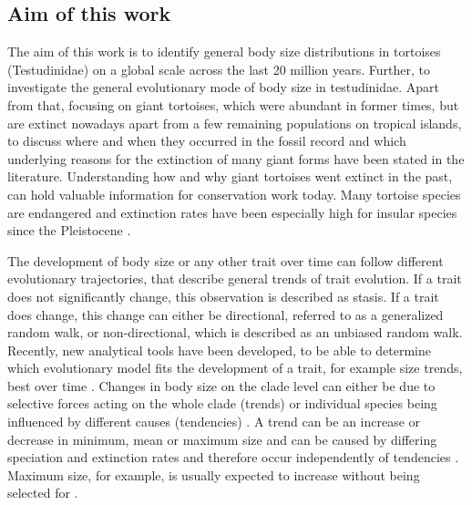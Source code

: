 
 

\subsection{Aim of this work}

The aim of this work is to identify general body size distributions in tortoises (Testudinidae) on a global scale across the last 20 million years. Further, to investigate the general evolutionary mode of body size in testudinidae. 
Apart from that, focusing on giant tortoises, which were abundant in former times, but are extinct nowadays apart from a few remaining populations on tropical islands, to discuss where and when they occurred in the fossil record and which underlying reasons for the extinction of many giant forms have been stated in the literature.
Understanding how and why giant tortoises went extinct in the past, can hold valuable information for conservation work today. Many tortoise species are endangered and extinction rates have been especially high for insular species since the Pleistocene \citep{Rhodin2015}.



The development of body size or any other trait over time can follow different evolutionary trajectories, that describe general trends of trait evolution. If a trait does not significantly change, this observation is described as stasis. If a trait does change, this change can either be directional, referred to as a generalized random walk, or non-directional, which is described as an unbiased random walk. Recently, new analytical tools have been developed, to be able to determine which evolutionary model fits the development of a trait, for example size trends, best over time \citep{Hunt2006,Hunt2015}.
Changes in body size on the clade level can either be due to selective forces acting on the whole clade (trends) or individual species being influenced by different causes (tendencies) \citep{Hunt2006}. A trend can be an increase or decrease in minimum, mean or maximum size and can be caused by differing speciation and extinction rates and therefore occur independently of tendencies \citep{Smith2016}. Maximum size, for example, is usually expected to increase without being selected for \citep{Smith2016}.


